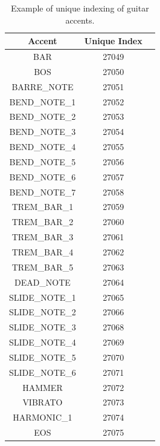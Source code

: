 \documentclass[twoside,11pt]{article}
\begin{document}
\noindent
\begin{table}[h!]
\centering
\begin{tabular}{|c|c|c|}
\hline
\textbf{Accent} & \textbf{Unique Index} \\
\hline
BAR  & 27049\\
BOS  & 27050\\
BARRE\_NOTE & 27051\\
BEND\_NOTE\_1 & 27052\\
BEND\_NOTE\_2 & 27053\\
BEND\_NOTE\_3 & 27054\\
BEND\_NOTE\_4 & 27055\\
BEND\_NOTE\_5 & 27056\\
BEND\_NOTE\_6 & 27057\\
BEND\_NOTE\_7 & 27058\\
TREM\_BAR\_1 & 27059\\
TREM\_BAR\_2 & 27060\\
TREM\_BAR\_3 & 27061\\
TREM\_BAR\_4 & 27062\\
TREM\_BAR\_5 & 27063\\
DEAD\_NOTE & 27064\\
SLIDE\_NOTE\_1 & 27065\\
SLIDE\_NOTE\_2 & 27066\\
SLIDE\_NOTE\_3 & 27068\\
SLIDE\_NOTE\_4 & 27069\\
SLIDE\_NOTE\_5 & 27070\\
SLIDE\_NOTE\_6 & 27071\\
HAMMER & 27072\\
VIBRATO & 27073\\
HARMONIC\_1 & 27074\\
EOS  & 27075\\
\hline
\end{tabular}
\caption{Example of unique indexing of guitar accents.}
\label{tab:accent_indexing}
\end{table}

\newpage
\end{document}
